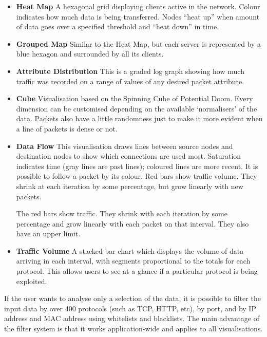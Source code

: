 \documentclass[12pt,a4paper]{article}
\begin{document}
			\begin{itemize}
            
            \item \textbf{Heat Map} A hexagonal grid displaying clients active in the network. Colour indicates how much data is being transferred. Nodes ``heat up'' when amount of data goes over a specified threshold and ``heat down'' in time.

	\item \textbf{Grouped Map} Similar to the Heat Map, but each server is represented by a blue hexagon and surrounded by all its clients.

            \item \textbf{Attribute Distribution} This is a graded log graph showing how much traffic was recorded on a range of values of any desired packet attribute.

            \item \textbf{Cube} Visualisation based on the Spinning Cube of Potential Doom. Every dimension can be customised depending on the available `normalisers' of the data. Packets also have a little randomness just to make it more evident when a line of packets is dense or not.

            \item \textbf{Data Flow} This visualisation draws lines between source nodes and destination nodes to show which connections are used most. Saturation indicates time (gray lines are past lines); coloured lines are more recent. It is possible to follow a packet by its colour. Red bars show traffic volume. They shrink at each iteration by some percentage, but grow linearly with new packets.
            
            The red bars show traffic. They shrink with each iteration by some
            percentage and grow linearly with each packet on that interval. They also
            have an upper limit.

            \item \textbf{Traffic Volume} A stacked bar chart which displays the volume of data arriving in each interval, with segments proportional to the totals for each protocol. This allows users to see at a glance if a particular protocol is being exploited.
            
            \end{itemize}
			
			If the user wants to analyse only a selection of the data, it is possible to filter the input data by over 400 protocols (such as TCP, HTTP, etc), by port, and by IP address and MAC address using whitelists and blacklists. The main advantage of the filter system is that it works application-wide and applies to all visualisations.
\end{document}
